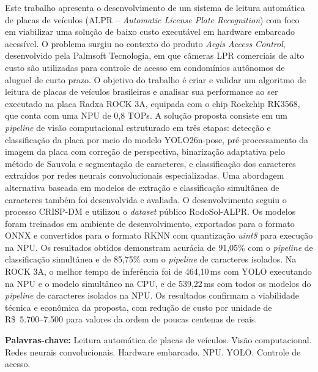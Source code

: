 \setlength{\absparsep}{18pt} %
\begin{resumo}
Este trabalho apresenta o desenvolvimento de um sistema de leitura automática de placas de veículos (ALPR -- \textit{Automatic License Plate Recognition}) com foco em viabilizar uma solução de baixo custo executável em hardware embarcado acessível. O problema surgiu no contexto do produto \textit{Aegis Access Control}, desenvolvido pela Palmsoft Tecnologia, em que câmeras LPR comerciais de alto custo são utilizadas para controle de acesso em condomínios autônomos de aluguel de curto prazo. O objetivo do trabalho é criar e validar um algoritmo de leitura de placas de veículos brasileiras e analisar sua performance ao ser executado na placa Radxa ROCK 3A, equipada com o chip Rockchip RK3568, que conta com uma NPU de 0,8 TOPs. A solução proposta consiste em um \textit{pipeline} de visão computacional estruturado em três etapas: detecção e classificação da placa por meio do modelo YOLO26n-pose, pré-processamento da imagem da placa com correção de perspectiva, binarização adaptativa pelo método de Sauvola e segmentação de caracteres, e classificação dos caracteres extraídos por redes neurais convolucionais especializadas. Uma abordagem alternativa baseada em modelos de extração e classificação simultânea de caracteres também foi desenvolvida e avaliada. O desenvolvimento seguiu o processo CRISP-DM e utilizou o \textit{dataset} público RodoSol-ALPR. Os modelos foram treinados em ambiente de desenvolvimento, exportados para o formato ONNX e convertidos para o formato RKNN com quantização \textit{uint8} para execução na NPU. Os resultados obtidos demonstram acurácia de 91,05\% com o \textit{pipeline} de classificação simultânea e de 85,75\% com o \textit{pipeline} de caracteres isolados. Na ROCK 3A, o melhor tempo de inferência foi de 464,10\,ms com YOLO executando na NPU e o modelo simultâneo na CPU, e de 539,22\,ms com todos os modelos do \textit{pipeline} de caracteres isolados na NPU. Os resultados confirmam a viabilidade técnica e econômica da proposta, com redução de custo por unidade de R\$~5.700--7.500 para valores da ordem de poucas centenas de reais.
 
\textbf{Palavras-chave:} Leitura automática de placas de veículos. Visão computacional. Redes neurais convolucionais. Hardware embarcado. NPU. YOLO. Controle de acesso.
 
\end{resumo}


